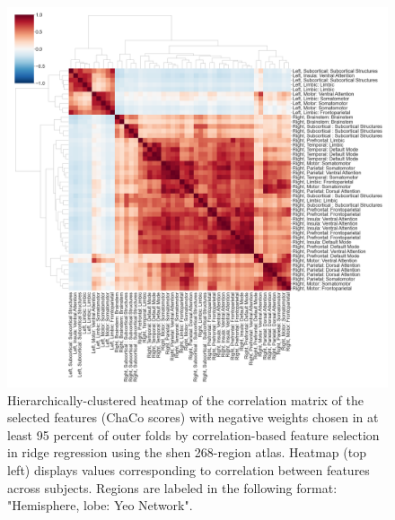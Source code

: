 \documentclass[10pt]{article}
\begin{document}
\begin{figure}[ht]
\centering
\includegraphics[width=1\linewidth]{figures/heatmap_shen268_correlation_neg.png}
\caption{Hierarchically-clustered heatmap of the correlation matrix of the selected features (ChaCo scores) with negative weights chosen in at least 95 percent of outer folds by correlation-based feature selection in ridge regression using the shen 268-region atlas. Heatmap (top left) displays values corresponding to correlation between features across subjects. Regions are labeled in the following format: "Hemisphere, lobe: Yeo Network".}
\label{heatmap_shen_negweights}
\end{figure}
\end{document}
